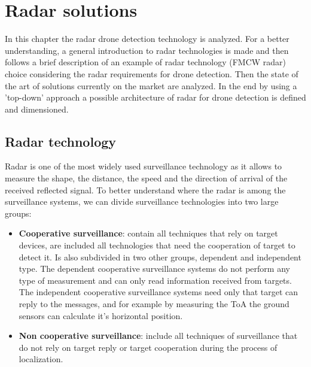 \chapter{Radar solutions}



In this chapter the radar drone detection technology is analyzed. For a better understanding, a general introduction to radar technologies is made and then follows a brief description of an example of radar technology (FMCW radar) choice considering the radar requirements for drone detection. Then the state of the art of solutions currently on the market are analyzed. 
In the end by using a 'top-down' approach a possible architecture of radar for drone detection is defined and dimensioned. 

\section{Radar technology}
Radar is one of the most widely used surveillance technology as it allows to measure the shape, the distance, the speed and the direction of arrival of the received reflected signal. To better understand where the radar is among the surveillance systems, we can divide surveillance technologies into two large groups: 
\begin{itemize}
     \item \textbf{Cooperative surveillance}: contain all techniques that rely on target devices, are included all technologies that need the cooperation of target to detect it. Is also subdivided in two other groups, dependent and independent type. The dependent cooperative surveillance systems do not perform any type of measurement and can only read information received from targets. The independent cooperative surveillance systems need only that target can reply to the messages, and for example by measuring the ToA the ground sensors can calculate it's horizontal position. 
         
    \item \textbf{Non cooperative surveillance}: include all techniques of surveillance that do not rely on target reply or target cooperation during the process of localization.
        
\end{itemize}


